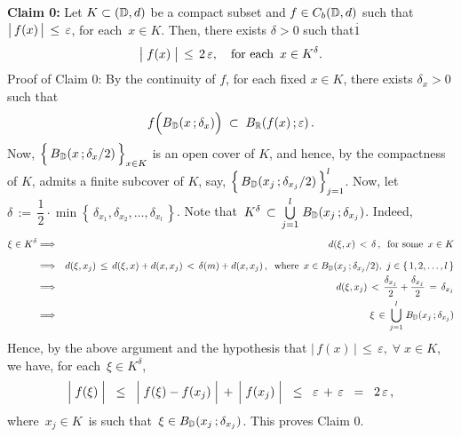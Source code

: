 \vskip 0.5cm
\noindent
\textbf{Claim 0:}\;\;
Let $K \subset (\mathbb{D},d)$ be a compact subset and $f \in C_{b}(\mathbb{D},d)$ such that
\,$\left\vert\, f(\overset{{\color{white}.}}{x}) \,\right\vert \,\leq\, \varepsilon$,
for each \,$x \in K$.
Then, there exists $\delta > 0$ such that{\color{white}$\overset{.}{1}$}
\begin{equation*}
\left\vert\; f(\overset{{\color{white}.}}{x}) \;\right\vert \,\leq\,  2\,\varepsilon,
\quad
\textnormal{for each \,$x \in K^{\delta}$}.
\end{equation*}
Proof of Claim 0:\;\;
By the continuity of $f$, for each fixed $x \in K$, there exists
$\delta_{x} > 0$ such that
\begin{equation*}
f\!\left(\overset{{\color{white}.}}{B}_{\D}(x\,;\delta_{x})\right)
\; \subset \;
	B_{\Re}\!\left(f(x)\,;\varepsilon\right).
\end{equation*}
Now, $\left\{\, \overset{{\color{white}.}}{B}_{\D}(x\,;\delta_{x}/2) \,\right\}_{x \in K}$
is an open cover of $K$, and hence, by the compactness of $K$, admits a finite
subcover of $K$, say,
$\left\{\, \overset{{\color{white}.}}{B}_{\D}(x_{j}\,;\delta_{x_{j}}/2) \,\right\}_{j = 1}^{l}$.
Now, let
\,$\delta \,:=\, \dfrac{1}{2}\cdot\min\!\left\{\,\delta_{x_{1}},\delta_{x_{2}},\ldots,\delta_{x_{l}}\,\right\}$.
Note that
\,$K^{\delta} \,\subset\, \overset{l}{\underset{j=1}{\bigcup}} \; B_{\mathbb{D}}(x_{j}\,;\delta_{x_{j}})$.
Indeed,
\begin{eqnarray*}
\xi \in K^{\delta}
&\Longrightarrow&
	d(\xi,x) \,<\, \delta\,, \;\;\textnormal{for some \,$x \in K$}
\\
&\overset{{\color{white}\overset{.}{1}}}{\Longrightarrow}&
	d(\xi,x_{j}) \,\leq\, d(\xi,x) + d(x,x_{j}) \,<\, \delta(m) + d(x,x_{j})\,,
	\;\;\textnormal{where \,$x \in B_{\D}(x_{j}\,;\delta_{x_{j}}/2)$, \,$j\in\{\,1,2,\ldots,l\,\}$}
\\
&\Longrightarrow&
	d(\xi,x_{j}) \,<\, \dfrac{\delta_{x_{j}}}{2} + \dfrac{\delta_{x_{j}}}{2} \,=\, \delta_{x_{j}}
\\
&\Longrightarrow&
	\xi \,\in\, \overset{l}{\underset{j=1}{\bigcup}} \; B_{\D}(x_{j}\,;\delta_{x_{j}})
\end{eqnarray*}
Hence, by the above argument and the hypothesis that $\vert\,f(x)\,\vert \,\leq\,\varepsilon,\;\forall\;x\in K$,
we have, for each \,$\xi \in K^{\delta}$,
\begin{equation*}
\left\vert\;\overset{{\color{white}.}}{f}(\xi)\;\right\vert
\;\; \leq \;\;
	\left\vert\;\overset{{\color{white}.}}{f}(\xi) - f(x_{j})\;\right\vert
	\,+\,
	\left\vert\;\overset{{\color{white}.}}{f}(x_{j})\;\right\vert
\;\; \leq \;\;
	\varepsilon \,+\, \varepsilon 
\;\; = \;\;
	2\,\varepsilon\,,
\end{equation*}
where \,$x_{j} \in K$\, is such that \,$\xi \in B_{\mathbb{D}}(x_{j}\,;\delta_{x_{j}})$.
This proves Claim 0.

